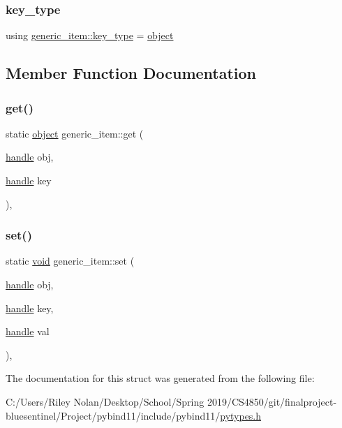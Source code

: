 \subsubsection{\texorpdfstring{key\_type}{key\_type}}
{\footnotesize\ttfamily using \mbox{\hyperlink{structgeneric__item_a68f3b78a1197a0102dde5e5e3d5a469b}{generic\+\_\+item\+::key\+\_\+type}} =  \mbox{\hyperlink{classobject}{object}}}



\subsection{Member Function Documentation}
\mbox{\label{structgeneric__item_a5891008ff5364e7f6d8d8caab9c94d48}} 
\subsubsection{\texorpdfstring{get()}{get()}}
{\footnotesize\ttfamily static \mbox{\hyperlink{classobject}{object}} generic\+\_\+item\+::get (\begin{DoxyParamCaption}\item[{\mbox{\hyperlink{classhandle}{handle}}}]{obj,  }\item[{\mbox{\hyperlink{classhandle}{handle}}}]{key }\end{DoxyParamCaption})\hspace{0.3cm}{\ttfamily [inline]}, {\ttfamily [static]}}

\mbox{\label{structgeneric__item_a83223e508d3929a33c1c304bc60b6374}} 
\subsubsection{\texorpdfstring{set()}{set()}}
{\footnotesize\ttfamily static \mbox{\hyperlink{_s_d_l__opengles2__gl2ext_8h_ae5d8fa23ad07c48bb609509eae494c95}{void}} generic\+\_\+item\+::set (\begin{DoxyParamCaption}\item[{\mbox{\hyperlink{classhandle}{handle}}}]{obj,  }\item[{\mbox{\hyperlink{classhandle}{handle}}}]{key,  }\item[{\mbox{\hyperlink{classhandle}{handle}}}]{val }\end{DoxyParamCaption})\hspace{0.3cm}{\ttfamily [inline]}, {\ttfamily [static]}}



The documentation for this struct was generated from the following file\+:\begin{DoxyCompactItemize}
\item 
C\+:/\+Users/\+Riley Nolan/\+Desktop/\+School/\+Spring 2019/\+C\+S4850/git/finalproject-\/bluesentinel/\+Project/pybind11/include/pybind11/\mbox{\hyperlink{pytypes_8h}{pytypes.\+h}}\end{DoxyCompactItemize}
